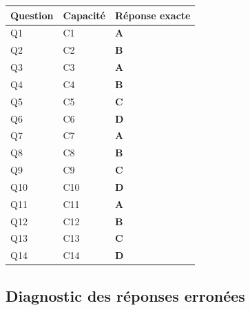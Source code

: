 \begin{center}
\begin{tabular}{lll}
\hline
Question & Capacité & Réponse exacte \\
\hline
Q1 & C1 & \textbf{A} \\
Q2 & C2 & \textbf{B} \\
Q3 & C3 & \textbf{A} \\
Q4 & C4 & \textbf{B} \\
Q5 & C5 & \textbf{C} \\
Q6 & C6 & \textbf{D} \\
Q7 & C7 & \textbf{A} \\
Q8 & C8 & \textbf{B} \\
Q9 & C9 & \textbf{C} \\
Q10 & C10 & \textbf{D} \\
Q11 & C11 & \textbf{A} \\
Q12 & C12 & \textbf{B} \\
Q13 & C13 & \textbf{C} \\
Q14 & C14 & \textbf{D} \\
\hline
\end{tabular}
\end{center}

\subsection*{Diagnostic des réponses erronées}

